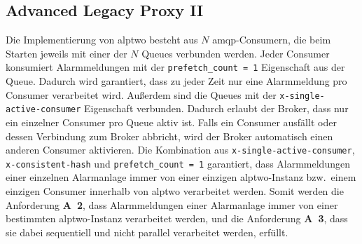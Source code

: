 \newpage

\subsection{Advanced Legacy Proxy II}
\label{sub-sec:alptwo}

Die Implementierung von \gls{alptwo} besteht aus $N$ \gls{amqp}-Consumern, die beim Starten jeweils mit einer der $N$ Queues verbunden werden. Jeder Consumer konsumiert Alarmmeldungen mit der \texttt{prefetch\_count = 1} Eigenschaft aus der Queue. Dadurch wird garantiert, dass zu jeder Zeit nur eine Alarmmeldung pro Consumer verarbeitet wird. Außerdem sind die Queues mit der \texttt{x-single-active-consumer} Eigenschaft verbunden. Dadurch erlaubt der Broker, dass nur ein einzelner Consumer pro Queue aktiv ist. Falls ein Consumer ausfällt oder dessen Verbindung zum Broker abbricht, wird der Broker automatisch einen anderen Consumer aktivieren. Die Kombination aus \texttt{x-single-active-consumer}, \texttt{x-consistent-hash} und \texttt{prefetch\_count = 1} garantiert, dass Alarmmeldungen einer einzelnen Alarmanlage immer von einer einzigen \gls{alptwo}-Instanz bzw.~einem einzigen Consumer innerhalb von \gls{alptwo} verarbeitet werden. Somit werden die Anforderung \textbf{A~2}, dass Alarmmeldungen einer Alarmanlage immer von einer bestimmten \gls{alptwo}-Instanz verarbeitet werden, und die Anforderung \textbf{A~3}, dass sie dabei sequentiell und nicht parallel verarbeitet werden, erfüllt.

